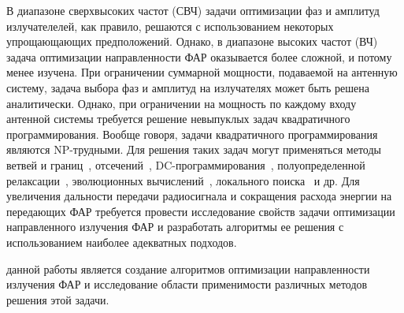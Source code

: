 {В диапазоне сверхвысоких частот (СВЧ) задачи оптимизации фаз и амплитуд излучателелей, как правило, решаются с использованием некоторых упрощающающих предположений. Однако, в диапазоне высоких частот (ВЧ)
задача оптимизации направленности ФАР оказывается более сложной, и потому менее изучена.
При ограничении суммарной мощности, подаваемой на антенную систему, задача выбора фаз и амплитуд на излучателях
может быть решена аналитически.
Однако, при ограничении на мощность по каждому входу антенной системы требуется решение невыпуклых задач квадратичного программирования. Вообще говоря, задачи квадратичного программирования являются NP-трудными. Для решения таких задач могут применяться методы ветвей и границ~, отсечений~, DC-программирования~, полуопределенной релаксации~, эволюционных вычислений~, локального поиска~ и др.
Для увеличения дальности передачи радиосигнала и сокращения расхода энергии на передающих ФАР требуется провести исследование свойств задачи оптимизации направленного излучения ФАР и разработать алгоритмы ее решения с использованием наиболее адекватных подходов.
}



{\aim} данной работы является создание алгоритмов оптимизации направленности излучения ФАР и исследование
области применимости различных методов решения этой задачи.

